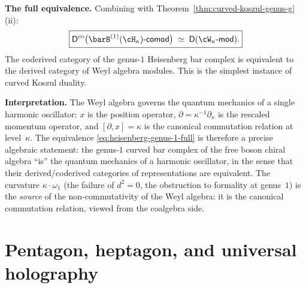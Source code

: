 \begin{example}
\smallskip\noindent
\textbf{The full equivalence.}
Combining with
Theorem~\ref{thm:curved-koszul-genus-g}(ii):
\begin{equation}\label{eq:heisenberg-genus-1-full}
 \boxed{
 \Dco\bigl(\barB^{(1)}(\cH_\kappa)\text{-}\mathsf{comod}\bigr)
 \;\simeq\;
 \mathsf{D}(\cW_\kappa\text{-}\mathsf{mod}).
 }
\end{equation}
The coderived category of the genus-$1$ Heisenberg bar complex is
equivalent to the derived category of Weyl algebra modules. This
is the simplest instance of curved Koszul duality.

\smallskip\noindent
\textbf{Interpretation.}
The Weyl algebra governs the quantum mechanics of a single
harmonic oscillator: $x$ is the position operator,
$\partial = \kappa^{-1}\partial_x$ is the rescaled momentum
operator, and $[\partial, x] = \kappa$ is the canonical
commutation relation at level~$\kappa$. The equivalence
\eqref{eq:heisenberg-genus-1-full} is therefore a precise algebraic
statement: the genus-$1$ curved bar complex of the free boson
chiral algebra ``is'' the quantum mechanics of a harmonic
oscillator, in the sense that their derived/coderived categories
of representations are equivalent. The curvature
$\kappa \cdot \omega_1$ (the failure of $d^2 = 0$, the obstruction
to formality at genus~$1$) is the \emph{source} of the
non-commutativity of the Weyl algebra: it is the canonical
commutation relation, viewed from the coalgebra side.
\end{example}

\section{Pentagon, heptagon, and universal holography}
\label{sec:factorization-sc-anchors}

